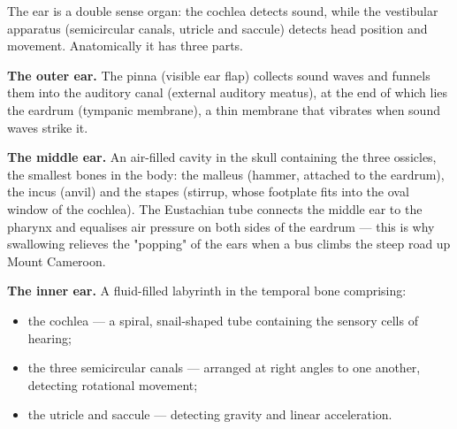 \documentclass[11pt]{article}
\newcommand{\cle}[1]{{\popxbold\color{popdark}#1}}
\newcounter{popsec}
\newcounter{popsub}
\newcommand{\courssub}[1]{%
  \stepcounter{popsub}%
  \par\vspace{9pt}\noindent{\popxbold\fontsize{11.5}{13}\selectfont\color{popink}{\color{poporange}\thepopsec.\thepopsub}\hspace{6pt}#1}\par\nopagebreak\vspace{4pt}
}
\begin{document}
\courssub{Structure of the Ear}

The ear is a double sense organ: the \cle{cochlea} detects sound, while the \cle{vestibular apparatus} (semicircular canals, utricle and saccule) detects head position and movement. Anatomically it has three parts.

\textbf{The outer ear.} The \cle{pinna} (visible ear flap) collects sound waves and funnels them into the \cle{auditory canal} (external auditory meatus), at the end of which lies the \cle{eardrum} (tympanic membrane), a thin membrane that vibrates when sound waves strike it.

\textbf{The middle ear.} An air-filled cavity in the skull containing the three \cle{ossicles}, the smallest bones in the body: the \cle{malleus} (hammer, attached to the eardrum), the \cle{incus} (anvil) and the \cle{stapes} (stirrup, whose footplate fits into the \cle{oval window} of the cochlea). The \cle{Eustachian tube} connects the middle ear to the pharynx and equalises air pressure on both sides of the eardrum — this is why swallowing relieves the "popping" of the ears when a bus climbs the steep road up Mount Cameroon.

\textbf{The inner ear.} A fluid-filled labyrinth in the temporal bone comprising:
\begin{itemize}
\item the \cle{cochlea} — a spiral, snail-shaped tube containing the sensory cells of hearing;
\item the three \cle{semicircular canals} — arranged at right angles to one another, detecting rotational movement;
\item the \cle{utricle} and \cle{saccule} — detecting gravity and linear acceleration.
\end{itemize}
\end{document}
